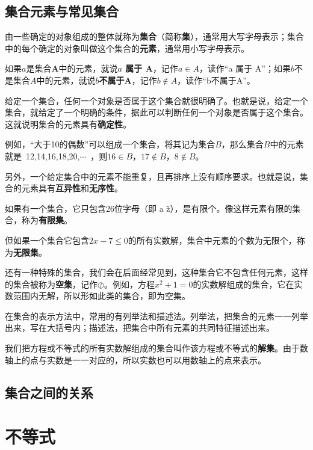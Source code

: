 \documentclass[a5paper]{article}
\begin{document}
\subsection{集合元素与常见集合}

由一些确定的对象组成的整体就称为\textbf{集合}（简称\textbf{集}），通常用大写字母表示；集合中的每个确定的对象叫做这个集合的\textbf{元素}，通常用小写字母表示。

如果$a$是集合\textbf{A}中的元素，就说\textbf{$a$ 属于 A}，记作$a \in A$，读作“a 属于 A”；如果$b$不是集合$A$中的元素，就说\textbf{$b$不属于A}，记作$b\notin A$，读作“b不属于A”。

\begin{tcolorbox}[colframe = blue!20, title = {\color{red} 提示}]
    给定一个集合，任何一个对象是否属于这个集合就很明确了。也就是说，给定一个集合，就给定了一个明确的条件，据此可以判断任何一个对象是否属于这个集合。这就说明集合的元素具有\textbf{确定性}。

    例如，“大于10的偶数”可以组成一个集合，将其记为集合$B$，那么集合$B$中的元素就是~12,14,16,18,20,$\cdots$~，则$16 \in B$，$17 \notin B$，$8 \notin B$。

    另外，一个给定集合中的元素不能重复，且再排序上没有顺序要求。也就是说，集合的元素具有\textbf{互异性}和\textbf{无序性}。
\end{tcolorbox}

如果有一个集合，它只包含26位字母（即 a \~ z），是有限个。像这样元素有限的集合，称为\textbf{有限集}。

但如果一个集合它包含$2x-7 \le 0$的所有实数解，集合中元素的个数为无限个，称为\textbf{无限集}。

还有一种特殊的集合，我们会在后面经常见到，这种集合它不包含任何元素，这样的集合被称为\textbf{空集}，记作$\oslash$。例如，方程$x^2 +1=0$的实数解组成的集合，它在实数范围内无解，所以形如此类的集合，即为空集。

在集合的表示方法中，常用的有列举法和描述法。列举法，把集合的元素一一列举出来，写在大括号内；描述法，把集合中所有元素的共同特征描述出来。

我们把方程或不等式的所有实数解组成的集合叫作该方程或不等式的\textbf{解集}。由于数轴上的点与实数是一一对应的，所以实数也可以用数轴上的点来表示。

\subsection{集合之间的关系}

\section{不等式}
\end{document}
